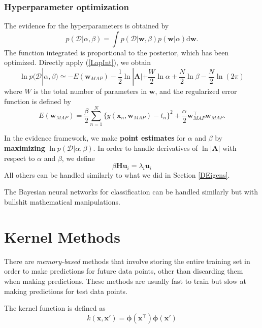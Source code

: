 \documentclass[a4paper]{report}
\newcommand{\ud}{\mathrm{d}}
\renewcommand{\bf}{\mathbf}
\renewcommand{\cal}{\mathcal}
\newcommand{\imp}[1]{{\color{blue}\textit{#1}}}
\newcommand{\bs}{\boldsymbol}
\begin{document}
\subsubsection{Hyperparameter optimization}
The evidence for the hyperparameters is obtained by
\begin{equation}
	p(\cal{D}|\alpha,\beta) = \int p(\cal{D}|\bf{w},\beta)p(\bf{w}|\alpha) \ud \bf{w}.
\end{equation}
The function integrated is proportional to the posterior, which has been optimized. Directly apply (\ref{LapInt}), we obtain
\begin{equation}
	\ln p(\cal{D}|\alpha,\beta) \simeq -E(\bf{w}_{MAP}) - \frac{1}{2} \ln |\bf{A}| + \frac{W}{2}\ln \alpha + \frac{N}{2} \ln \beta -\frac{N}{2} \ln(2\pi)
\end{equation}
where $W$ is the total number of parameters in $\bf{w}$, and the regularized error function is defined by
\begin{equation}
	E(\bf{w}_{MAP}) = \frac{\beta}{2} \sum_{n=1}^N \{ y(\bf{x}_n,\bf{w}_{MAP})-t_n \}^2 + \frac{\alpha}{2}\bf{w}_{MAP}^{\intercal} \bf{w}_{MAP}.
\end{equation}

In the evidence framework, we make \textbf{point estimates} for $\alpha$ and $\beta$ by \textbf{maximizing} $\ln p(\cal{D}|\alpha,\beta)$. In order to handle derivatives of $\ln |\bf{A}|$ with respect to $\alpha$ and $\beta$, we define
\begin{equation}
	\beta \bf{H} \bf{u}_i = \lambda_i \bf{u}_i
\end{equation}
All others can be handled similarly to what we did in Section \ref{DEigens}.

The Bayesian neural networks for classification can be handled similarly but with bullshit mathematical manipulations.
\section{Kernel Methods}
There are \imp{memory-based} methods that involve storing the entire training set in order to make predictions for future data points, other than discarding them when making predictions. These methods are usually fast to train but slow at making predictions for test data points.

The kernel function is defined as
\begin{equation}
	k(\bf{x,x'}) = \bs{\phi}(\bf{x}^{\intercal}) \bs{\phi}(\bf{x'})
\end{equation}
\end{document}
